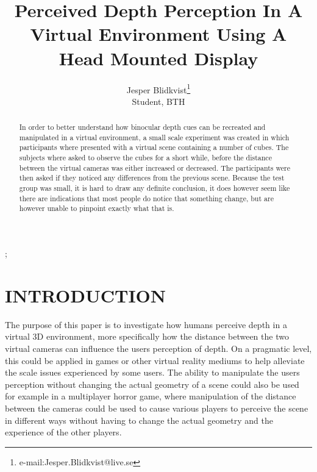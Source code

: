 \documentclass[tog]{acmsiggraph}
\title{Perceived Depth Perception In A Virtual Environment Using A Head Mounted Display}
\author{Jesper Blidkvist\thanks{e-mail:Jesper.Blidkvist@live.se}\\Student, BTH}
\begin{document}


\maketitle

\begin{abstract}
In order to better understand how binocular depth cues can be recreated and manipulated in a virtual environment, a small scale experiment was created in which participants where presented with a virtual scene containing a number of cubes. The subjects where asked to observe the cubes for a short while, before the distance between the virtual cameras was either increased or decreased. The participants were then asked if they noticed any differences from the previous scene. Because the test group was small, it is hard to draw any definite conclusion, it does however seem like there are indications that most people do notice that something change, but are however unable to pinpoint exactly what that is. 



\end{abstract}

\begin{CRcatlist}
  ;
\end{CRcatlist}

\keywordlist


\copyrightspace

\section{INTRODUCTION}

The purpose of this paper is to investigate how humans perceive depth in a virtual 3D environment, more specifically how the distance between the two virtual cameras can influence the users perception of depth. On a pragmatic level, this could be applied in games or other virtual reality mediums to help alleviate the scale issues experienced by some users. The ability to manipulate the users perception without changing the actual geometry of a scene could also be used for example in a multiplayer horror game, where manipulation of the distance between the cameras could be used to cause various players to perceive the scene in different ways without having to change the actual geometry and the experience of the other players.
\end{document}
